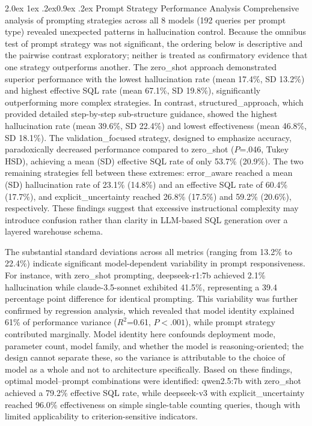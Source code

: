 \documentclass[10pt,twocolumn]{article}
\makeatletter
\renewcommand\subsection{\@startsection{subsection}{2}{\z@}%
  {2.0ex \@plus 1ex \@minus .2ex}{0.9ex \@plus .2ex}%
  {\normalfont\normalsize\bfseries}}
\makeatother
\begin{document}
\subsection{Prompt Strategy Performance Analysis}
Comprehensive analysis of prompting strategies across all 8 models (192 queries
per prompt type) revealed unexpected patterns in hallucination control. Because the omnibus test of prompt strategy was not significant, the ordering below is descriptive and the pairwise contrast exploratory; neither is treated as confirmatory evidence that one strategy outperforms another. The
zero\_shot approach demonstrated superior performance with the lowest
hallucination rate (mean 17.4\%, SD 13.2\%) and highest effective SQL rate (mean 67.1\%, SD 19.8\%), significantly outperforming more complex strategies. In
contrast, structured\_approach, which provided detailed step-by-step
sub-structure guidance, showed the highest hallucination rate (mean 39.6\%, SD 22.4\%) and lowest effectiveness (mean 46.8\%, SD 18.1\%). The
validation\_focused strategy, designed to emphasize accuracy, paradoxically
decreased performance compared to zero\_shot ($P$=.046, Tukey HSD), achieving a mean (SD) effective SQL rate of only 53.7\% (20.9\%). The two remaining
strategies fell between these extremes: error\_aware reached a mean (SD) hallucination rate of 23.1\% (14.8\%) and an effective SQL rate of 60.4\% (17.7\%), and explicit\_uncertainty reached 26.8\% (17.5\%) and 59.2\% (20.6\%), respectively. These findings suggest
that excessive instructional complexity may introduce confusion rather than
clarity in LLM-based SQL generation over a layered warehouse schema.

The substantial standard deviations across all metrics (ranging from 13.2\% to 22.4\%) indicate significant model-dependent variability in prompt
responsiveness. For instance, with zero\_shot prompting, deepseek-r1:7b achieved 2.1\% hallucination while claude-3.5-sonnet exhibited 41.5\%, representing a 39.4 percentage point difference for identical prompting. This variability was
further confirmed by regression analysis, which revealed that model identity
explained 61\% of performance variance ($R^2$=0.61, $P<.001$), while prompt strategy contributed marginally. Model identity here confounds deployment mode, parameter count, model family, and whether the model is reasoning-oriented; the design cannot separate these, so the variance is attributable to the choice of model as a whole and not to architecture specifically. Based on these findings, optimal model--prompt
combinations were identified: qwen2.5:7b with zero\_shot achieved a 79.2\% effective SQL rate, while deepseek-v3 with explicit\_uncertainty reached 96.0\% effectiveness on simple single-table counting queries, though with limited
applicability to criterion-sensitive indicators.
\end{document}
